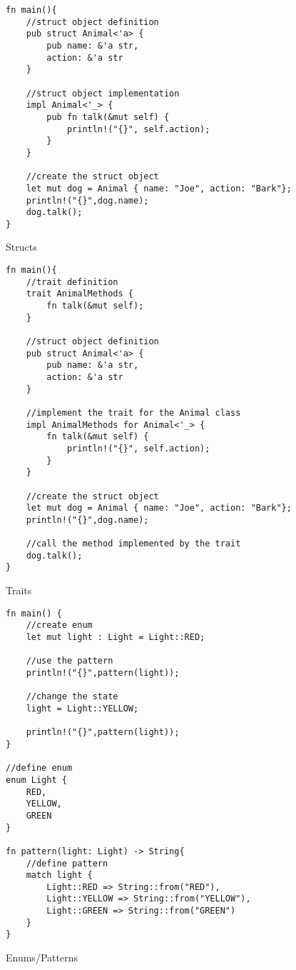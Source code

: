 \documentclass[sigconf,authorversion,nonacm]{acmart}
\begin{document}
\begin{figure} [H] 
\caption{Structs}
    \begin{lstlisting}
fn main(){
    //struct object definition
    pub struct Animal<'a> {
        pub name: &'a str,
        action: &'a str
    }

    //struct object implementation
    impl Animal<'_> {
        pub fn talk(&mut self) {
            println!("{}", self.action);
        }
    }

    //create the struct object
    let mut dog = Animal { name: "Joe", action: "Bark"};
    println!("{}",dog.name);
    dog.talk();
}
    \end{lstlisting}
\end{figure}

\begin{figure} [H] 
\caption{Traits}
    \begin{lstlisting}
fn main(){
    //trait definition
    trait AnimalMethods {
        fn talk(&mut self);
    }

    //struct object definition
    pub struct Animal<'a> {
        pub name: &'a str,
        action: &'a str
    }

    //implement the trait for the Animal class
    impl AnimalMethods for Animal<'_> {
        fn talk(&mut self) {
            println!("{}", self.action);
        }
    }

    //create the struct object
    let mut dog = Animal { name: "Joe", action: "Bark"};
    println!("{}",dog.name);

    //call the method implemented by the trait
    dog.talk();
}
    \end{lstlisting}
\end{figure}

\begin{figure} [H] 
\caption{Enums/Patterns}
    \begin{lstlisting}
fn main() {
    //create enum
    let mut light : Light = Light::RED;

    //use the pattern
    println!("{}",pattern(light));

    //change the state
    light = Light::YELLOW;
    
    println!("{}",pattern(light));
}

//define enum
enum Light {
    RED,
    YELLOW,
    GREEN
}
 
fn pattern(light: Light) -> String{
    //define pattern
    match light {
        Light::RED => String::from("RED"),
        Light::YELLOW => String::from("YELLOW"),
        Light::GREEN => String::from("GREEN")
    }
}
    \end{lstlisting}
\end{figure}
\end{document}
